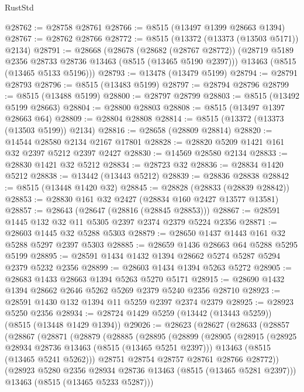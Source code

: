 \begin{lexlean}{RustStd}
\begin{coremodule}
@28762 := @28758 @28761
@28766 := @8515 (@13497 @1399 @28663 @1394)
@28767 := @28762 @28766
@28772 := @8515 (@13372 (@13373 (@13503 @5171)) @2134)
@28791 := @28668
    (@28678
      (@28682 (@28767 @28772))
      (@28719 @5189 @2356 @28733 @28736 @13463 (@8515 (@13465 @5190 @2397)))
      @13463
      (@8515 (@13465 @5133 @5196)))
@28793 := @13478 (@13479 @5199)
@28794 := @28791 @28793
@28796 := @8515 (@13483 @5199)
@28797 := @28794 @28796
@28799 := @8515 (@13488 @5199)
@28800 := @28797 @28799
@28803 := @8515 (@13492 @5199 @28663)
@28804 := @28800 @28803
@28808 := @8515 (@13497 @1397 @28663 @64)
@28809 := @28804 @28808
@28814 := @8515 (@13372 (@13373 (@13503 @5199)) @2134)
@28816 := @28658 (@28809 @28814)
@28820 := @14544 @28580 @2134 @2167 @17801
@28828 := @28820 @5209 @1421 @161 @32 @2397 @5212 @2397 @2427
@28830 := @14569 @28580 @2134
@28833 := @28830 @1421 @32 @5212
@28834 := @28723 @32
@28836 := @28834 @1420 @5212
@28838 := @13442 (@13443 @5212)
@28839 := @28836 @28838
@28842 := @8515 (@13448 @1420 @32)
@28845 := @28828 (@28833 (@28839 @28842))
@28853 := @28830 @161 @32 @2427 (@28834 @160 @2427 @13577 @13581)
@28857 := @28643 (@28647 (@28816 (@28845 @28853)))
@28867 := @28591 @1445 @132 @32 @11 @5305 @2397 @2374 @2379 @5224 @2356
@28871 := @28603 @1445 @32 @5288 @5303
@28879 := @28650 @1437 @1443 @161 @32 @5288 @5297 @2397 @5303
@28885 := @28659 @1436 @28663 @64 @5288 @5295 @5199
@28895 := @28591 @1434 @1432 @1394 @28662 @5274 @5287 @5294 @2379 @5232 @2356
@28899 := @28603 @1434 @1394 @5263 @5272
@28905 := @28683 @1433 @28663 @1394 @5263 @5270 @5171
@28915 := @28690 @1432 @1394 @28662 @2646 @5262 @5269 @2379 @5240 @2356 @28710
@28923 := @28591 @1430 @132 @1394 @11 @5259 @2397 @2374 @2379
@28925 := @28923 @5250 @2356
@28934 := @28724 @1429 @5259 (@13442 (@13443 @5259)) (@8515 (@13448 @1429 @1394))
@29026 := @28623
    (@28627
      (@28633
        (@28857
          (@28867
            (@28871
              (@28879
                (@28885
                  (@28895
                    (@28899
                      (@28905
                        (@28915
                          (@28925 @28934 @28736 @13463 (@8515 (@13465 @5251 @2397)))
                          @13463
                          (@8515 (@13465 @5241 @5262)))
                        @28751
                        @28754
                        @28757
                        @28761
                        @28766
                        @28772))
                    (@28923 @5280 @2356 @28934 @28736 @13463 (@8515 (@13465 @5281 @2397)))
                    @13463
                    (@8515 (@13465 @5233 @5287)))

\end{coremodule}
\end{lexlean}
